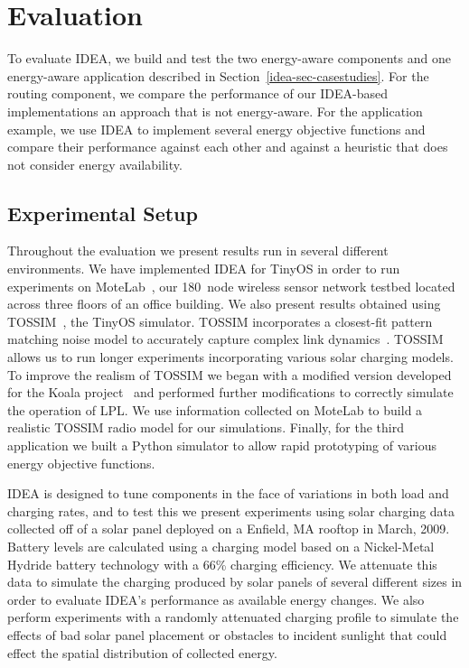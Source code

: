 \section{Evaluation}
\label{idea-sec-evaluation}

To evaluate IDEA, we build and test the two energy-aware components and one
energy-aware application described in Section~\ref{idea-sec-casestudies}. For
the routing component, we compare the performance of our IDEA-based
implementations an approach that is not energy-aware. For the application
example, we use IDEA to implement several energy objective functions and
compare their performance against each other and against a heuristic that
does not consider energy availability.

\subsection{Experimental Setup}
\label{idea-subsec-experimentalsetup}

Throughout the evaluation we present results run in several different
environments. We have implemented IDEA for TinyOS in order to run experiments
on MoteLab~\cite{motelab}, our 180~node wireless sensor network testbed
located across three floors of an office building. We also present results
obtained using TOSSIM~\cite{tossim}, the TinyOS simulator. TOSSIM
incorporates a closest-fit pattern matching noise model to accurately capture
complex link dynamics~\cite{cpm-ipsn07}. TOSSIM allows us to run longer
experiments incorporating various solar charging models. To improve the
realism of TOSSIM we began with a modified version developed for the Koala
project~\cite{koala-ipsn08} and performed further modifications to correctly
simulate the operation of LPL. We use information collected on MoteLab to
build a realistic TOSSIM radio model for our simulations. Finally, for the
third application we built a Python simulator to allow rapid prototyping of
various energy objective functions.

IDEA is designed to tune components in the face of variations in both load
and charging rates, and to test this we present experiments using solar
charging data collected off of a solar panel deployed on a Enfield, MA
rooftop in March, 2009. Battery levels are calculated using a charging model
based on a Nickel-Metal Hydride battery technology with a 66\% charging
efficiency. We attenuate this data to simulate the charging produced by solar
panels of several different sizes in order to evaluate IDEA's performance as
available energy changes. We also perform experiments with a randomly
attenuated charging profile to simulate the effects of bad solar panel
placement or obstacles to incident sunlight that could effect the spatial
distribution of collected energy.

